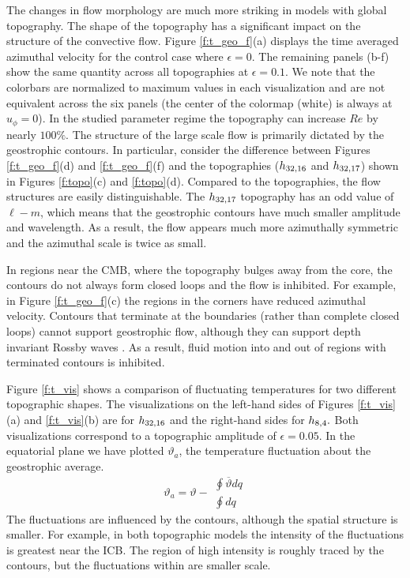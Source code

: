 The changes in flow morphology are much more striking in models with global topography. 
The shape of the topography has a significant impact on the structure of the convective flow. 
Figure \ref{f:t_geo_f}(a) displays the time averaged azimuthal velocity for the control case where $\epsilon =0$. The remaining panels (b-f) show the same quantity across all topographies at $\epsilon  = 0.1$.
We note that the colorbars are normalized to maximum values in each visualization and are not equivalent across the six panels (the center of the colormap (white) is always at $u_{\phi} = 0$). In the studied parameter regime the topography can increase $Re$ by nearly $100\%$.
The structure of the large scale flow is primarily dictated by the geostrophic contours. In particular, consider the difference between Figures \ref{f:t_geo_f}(d) and \ref{f:t_geo_f}(f) and the topographies ($h_{32,16}$ and $h_{32,17}$) shown in Figures \ref{f:topo}(c) and \ref{f:topo}(d). Compared to the topographies, the flow structures are easily distinguishable. The $h_{32,17}$ topography has an odd value of $\ell-m$, which means that the geostrophic contours have much smaller amplitude and wavelength. As a result, the flow appears much more azimuthally symmetric and the azimuthal scale is twice as small.

In regions near the CMB, where the topography bulges away from the core, the contours do not always form closed loops and the flow is inhibited. For example, in Figure \ref{f:t_geo_f}(c) the regions in the corners have reduced azimuthal velocity.
Contours that terminate at the boundaries (rather than complete closed loops) cannot support geostrophic flow, although they can support depth invariant Rossby waves \citep{hG68}.
As a result, fluid motion into and out of regions with terminated contours is inhibited.

Figure \ref{f:t_vis} shows a comparison of fluctuating temperatures for two different topographic shapes. 
The visualizations on the left-hand sides of Figures \ref{f:t_vis}(a) and \ref{f:t_vis}(b) are for $ h_{32,16}$ and the right-hand sides for $h_{8,4}.$ 
Both visualizations correspond to a topographic amplitude of $\epsilon  = 0.05$.
In the equatorial plane we have plotted $\vartheta_{a}$, the temperature fluctuation about the geostrophic average.
\[
\vartheta_{a} = \vartheta-
	\begin{aligned}
		\oint \overline{\vartheta} dq\\[1pt]
		\hline
\oint dq
\end{aligned}\] 
The fluctuations are influenced by the contours, although the spatial structure is smaller. 
For example, in both topographic models the intensity of the fluctuations is greatest near the ICB. The region of high intensity is roughly traced by the contours, but the fluctuations within are smaller scale.

